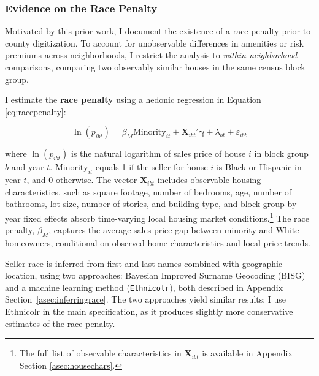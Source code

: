 \documentclass[11pt]{article}
\begin{document}
\subsubsection{Evidence on the Race Penalty}
Motivated by this prior work, I document the existence of a race penalty prior to county digitization. To account for unobservable differences in amenities or risk premiums across neighborhoods, I restrict the analysis to \textit{within-neighborhood} comparisons, comparing two observably similar houses in the same census block group.

I estimate the \textbf{race penalty}  using a hedonic regression in Equation \ref{eq:racepenalty}: 

\begin{equation} \label{eq:racepenalty}
\ln(p_{ibt}) = 
\beta_M \text{Minority}_{it} + \mathbf{X}_{ibt}'\boldsymbol{\gamma} + \lambda_{bt} + \varepsilon_{ibt}
\end{equation}

where $\ln(p_{ibt})$ is the natural logarithm of sales price of house $i$ in block group $b$ and year $t$. $\text{Minority}_{it}$ equals 1 if the seller for house $i$ is Black or Hispanic in year $t$, and 0 otherwise. The vector $\mathbf{X}_{ibt}$ includes observable housing characteristics, such as square footage, number of bedrooms, age, number of bathrooms, lot size, number of stories, and building type, and block group-by-year fixed effects absorb time-varying local housing market conditions.\footnote{The full list of observable characteristics in $\mathbf{X}_{ibt}$ is available in Appendix Section \ref{asec:housechars}.} The race penalty, $\beta_M$, captures the average sales price gap between minority and White homeowners, conditional on observed home characteristics and local price trends. 

Seller race is inferred from first and last names combined with geographic location, using two approaches: Bayesian Improved Surname Geocoding (BISG) and a machine learning method (\texttt{Ethnicolr}), both described in Appendix Section~\ref{asec:inferringrace}. The two approaches yield similar results; I use Ethnicolr in the main specification, as it produces slightly more conservative estimates of the race penalty.
\end{document}
